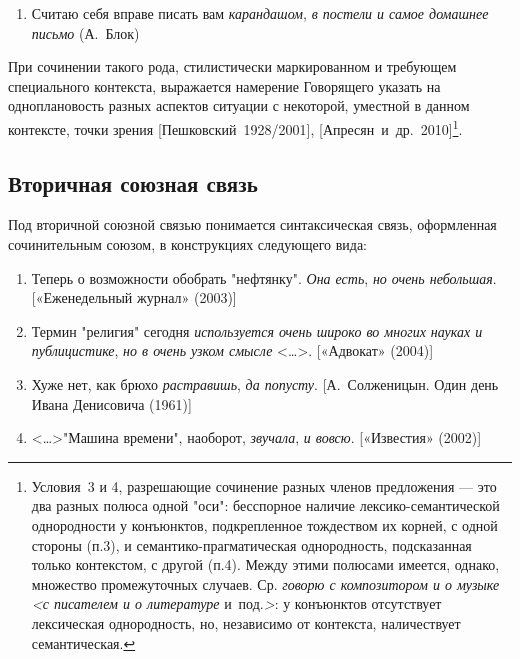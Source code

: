 \begin{enumerate}
\def\labelenumi{(\arabic{enumi})}
\setcounter{enumi}{42}
\item
  Считаю себя вправе писать вам \textit{карандашом}, \textit{в постели и
  самое домашнее письмо} (А.~Блок)
\end{enumerate}

При сочинении такого рода, стилистически маркированном и требующем
специального контекста, выражается намерение Говорящего указать на
одноплановость разных аспектов ситуации с некоторой, уместной в данном
контексте, точки зрения {[}Пешковский~1928/2001{]},
{[}Апресян~и~др.~2010{]}\footnote{Условия~3 и 4, разрешающие сочинение
  разных членов предложения --- это два разных полюса одной "оси":
  бесспорное наличие лексико-семантической однородности у конъюнктов,
  подкрепленное тождеством их корней, с одной стороны (п.3), и
  семантико-прагматическая однородность, подсказанная только контекстом,
  с другой (п.4). Между этими полюсами имеется, однако, множество
  промежуточных случаев. Ср. \textit{говорю с композитором и о музыке
  \textless с писателем и о литературе} и~под.\textit{\textgreater{}}: у
  конъюнктов отсутствует лексическая однородность, но, независимо от
  контекста, наличествует семантическая.}.

\subsection{Вторичная союзная
связь}\label{ux432ux442ux43eux440ux438ux447ux43dux430ux44f-ux441ux43eux44eux437ux43dux430ux44f-ux441ux432ux44fux437ux44c}

Под вторичной союзной связью понимается синтаксическая связь,
оформленная сочинительным союзом, в конструкциях следующего вида:

\begin{enumerate}
\def\labelenumi{(\arabic{enumi})}
\setcounter{enumi}{43}
\item
  Теперь о возможности обобрать "нефтянку". \textit{Она есть}, \textit{но
  очень небольшая}. {[}«Еженедельный журнал» (2003){]}
\item
  Термин "религия" сегодня \textit{используется очень широко во многих
  науках и публицистике}, \textit{но в очень узком смысле}
  \textless\ldots\textgreater. {[}«Адвокат» (2004){]}
\item
  Хуже нет, как брюхо \textit{растравишь}, \textit{да попусту}.
  {[}А.~Солженицын. Один день Ивана Денисовича (1961){]}
\item
  \textless\ldots\textgreater"Машина времени", наоборот, \textit{звучала},
  \textit{и вовсю}. {[}«Известия» (2002){]}
\end{enumerate}

